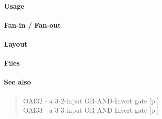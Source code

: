 \paragraph{Usage}

\paragraph{Fan-in / Fan-out}

\paragraph{Layout}

\paragraph{Files}

\paragraph{See also}
\begin{quote}
    OAI32 - a 3-2-input OR-AND-Invert gate [p.\pageref{OAI32}] \\
    OAI33 - a 3-3-input OR-AND-Invert gate [p.\pageref{OAI33}]
\end{quote}
